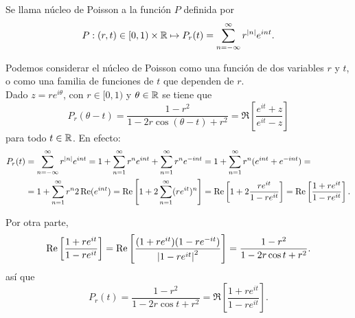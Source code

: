 \begin{definition}
    Se llama núcleo de Poisson a la función $P$ definida por
    \begin{equation}
        \label{eq:poisson1}
        P:(r,t) \in [0,1)\times \mathbb{R} \mapsto P_r(t) = \sum_{n=-\infty}^{\infty} r^{\left\lvert n\right\rvert}e^{int}.
    \end{equation}

    Podemos considerar el núcleo de Poisson como una función de dos variables $r$ y $t$, o como una familia de funciones de $t$ que dependen de $r$. \\

    Dado $z = re^{i \theta}$, con $r \in [0,1)$ y $\theta \in \mathbb{R}$ se tiene que
    \begin{equation}
        \label{eq:poisson2}
        P_r(\theta - t) =  \dfrac{1 - r^2}{1 - 2r \cos (\theta - t) + r^2} = \Re \left[ \dfrac{e^{it} + z}{e^{it} - z} \right]
    \end{equation}
    para todo $t \in \mathbb{R}$. En efecto:
    \begin{equation*}
        \begin{split}
            P_r(t) & = \sum_{n=-\infty}^{\infty} r^{\left\lvert n\right\rvert}e^{int} = 1 + \sum_{n=1}^{\infty} r^n e^{int} + \sum_{n=1}^{\infty} r^n e^{-int} = 1 + \sum_{n=1}^{\infty} r^n (e^{int} + e^{-int}) = \\
                   & =  1 + \sum_{n=1}^{\infty} r^n 2 \operatorname{Re}(e^{int}) = \operatorname{Re} \left[ 1 + 2 \sum_{n=1}^{\infty} (r e^{it})^n  \right] = \operatorname{Re} \left[ 1 + 2 \dfrac{re^{it}}{1-re^{it}} \right] = \operatorname{Re} \left[\dfrac{1 + re^{it}}{1-re^{it}} \right].
        \end{split}
    \end{equation*}

    Por otra parte,
    \begin{equation}
        \label{eq:poisson3}
        \operatorname{Re} \left[ \dfrac{1 + re^{it}}{1-re^{it}} \right] = \operatorname{Re} \left[ \dfrac{(1 + re^{it})(1 - re^{-it})}{\left\lvert1-re^{it}\right\rvert^2} \right] = \dfrac{1 - r^2}{1 - 2r \cos t + r^2}.
    \end{equation}
    así que
    \begin{equation}
        \label{eq:poisson4}
        P_r(t) =  \dfrac{1 - r^2}{1 - 2r \cos t + r^2} = \Re \left[ \dfrac{1 + re^{it}}{1 - re^{it}} \right]. %
    \end{equation}
\end{definition}
\medskip

